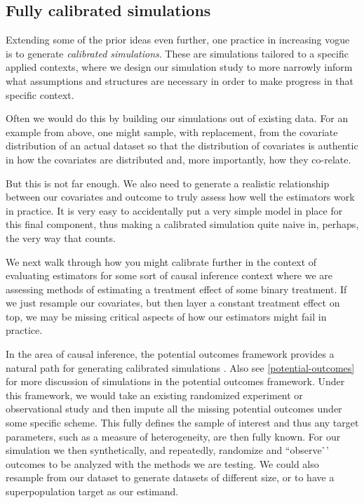 \documentclass[
]{book}
\begin{document}
\subsection{Fully calibrated simulations}\label{fully-calibrated-simulations}

Extending some of the prior ideas even further, one practice in increasing vogue is to generate \emph{calibrated simulations}.
These are simulations tailored to a specific applied contexts, where we design our simulation study to more narrowly inform what assumptions and structures are necessary in order to make progress in that specific context.

Often we would do this by building our simulations out of existing data.
For an example from above, one might sample, with replacement, from the covariate distribution of an actual dataset so that the distribution of covariates is authentic in how the covariates are distributed and, more importantly, how they co-relate.

But this is not far enough.
We also need to generate a realistic relationship between our covariates and outcome to truly assess how well the estimators work in practice.
It is very easy to accidentally put a very simple model in place for this final component, thus making a calibrated simulation quite naive in, perhaps, the very way that counts.

We next walk through how you might calibrate further in the context of evaluating estimators for some sort of causal inference context where we are assessing methods of estimating a treatment effect of some binary treatment.
If we just resample our covariates, but then layer a constant treatment effect on top, we may be missing critical aspects of how our estimators might fail in practice.

In the area of causal inference, the potential outcomes framework provides a natural path for generating calibrated simulations \citep{Kern_calibrated}.
Also see \ref{potential-outcomes} for more discussion of simulations in the potential outcomes framework.
Under this framework, we would take an existing randomized experiment or observational study and then impute all the missing potential outcomes under some specific scheme.
This fully defines the sample of interest and thus any target parameters, such as a measure of heterogeneity, are then fully known.
For our simulation we then synthetically, and repeatedly, randomize and ``observe'\,' outcomes to be analyzed with the methods we are testing.
We could also resample from our dataset to generate datasets of different size, or to have a superpopulation target as our estimand.
\end{document}
